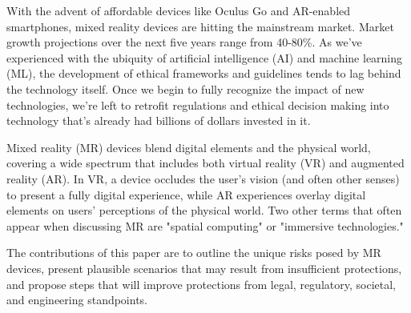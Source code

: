With the advent of affordable devices like Oculus Go and AR-enabled smartphones, mixed reality devices are hitting the mainstream market. Market growth projections over the next five years range from 40-80\%. As we've experienced with the ubiquity of artificial intelligence (AI) and machine learning (ML), the development of ethical frameworks and guidelines tends to lag behind the technology itself. Once we begin to fully recognize the impact of new technologies, we're left to retrofit regulations and ethical decision making into technology that's already had billions of dollars invested in it.


Mixed reality (MR) devices blend digital elements and the physical world, covering a wide spectrum that includes both virtual reality (VR) and augmented reality (AR). In VR, a device occludes the user's vision (and often other senses) to present a fully digital experience, while AR experiences overlay digital elements on users' perceptions of the physical world. Two other terms that often appear when discussing MR are "spatial computing" or "immersive technologies."


The contributions of this paper are to outline the unique risks posed by MR devices, present plausible scenarios that may result from insufficient protections, and propose steps that will improve protections from legal, regulatory, societal, and engineering standpoints.



